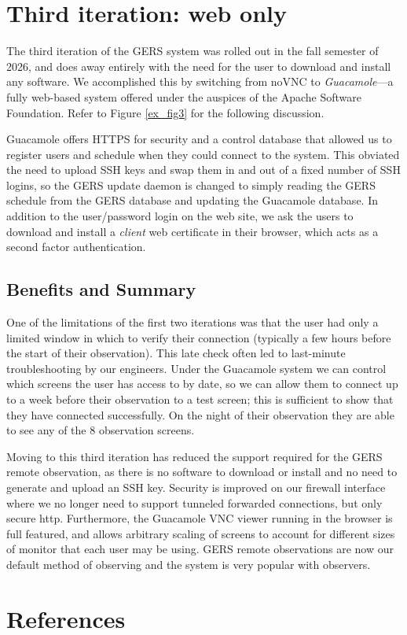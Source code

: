 \documentclass[11pt,twoside]{article}
\begin{document}
\section{Third iteration: web only}
The third iteration of the GERS system was rolled out in the fall semester of 2026,
and does away entirely with the need for the user to download and install any software.
We accomplished this by switching from noVNC to \emph{Guacamole}\citep{Guacamole}---a fully
web-based system offered under the auspices of the Apache Software Foundation.
Refer to Figure \ref{ex_fig3} for the following discussion.  

Guacamole offers HTTPS for security and a control database that allowed us to register
users and schedule when they could connect to the system.
This obviated the need to upload SSH keys and swap them in and out of a fixed number
of SSH logins, so the GERS update daemon is changed to simply reading the GERS schedule
from the GERS database and updating the Guacamole database.
In addition to the user/password login on the web site, we ask the users to download and install a
\emph{client} web certificate in their browser, which acts as a second factor authentication.


\subsection{Benefits and Summary}
One of the limitations of the first two iterations was that the user had only a limited
window in which to verify their connection (typically a few hours before the start of
their observation).  This late check often led to last-minute troubleshooting by our
engineers.  Under the Guacamole system we can control which screens the user has access
to by date, so we can allow them to connect up to a week before their observation to
a test screen; this is sufficient to show that they have connected successfully.
On the night of their observation they are able to see any of the 8 observation screens.

Moving to this third iteration has reduced the support required for the GERS remote
observation, as there is no software to download or install and no need to generate and
upload an SSH key.  Security is improved on our firewall interface where we no longer need to
support tunneled forwarded connections, but only secure http.  Furthermore, the Guacamole
VNC viewer running in the browser is full featured, and allows arbitrary scaling
of screens to account for different sizes of monitor that each user may be using.
GERS remote observations are now our default method of observing and the system is very
popular with observers.




\section{References}


\end{document}
